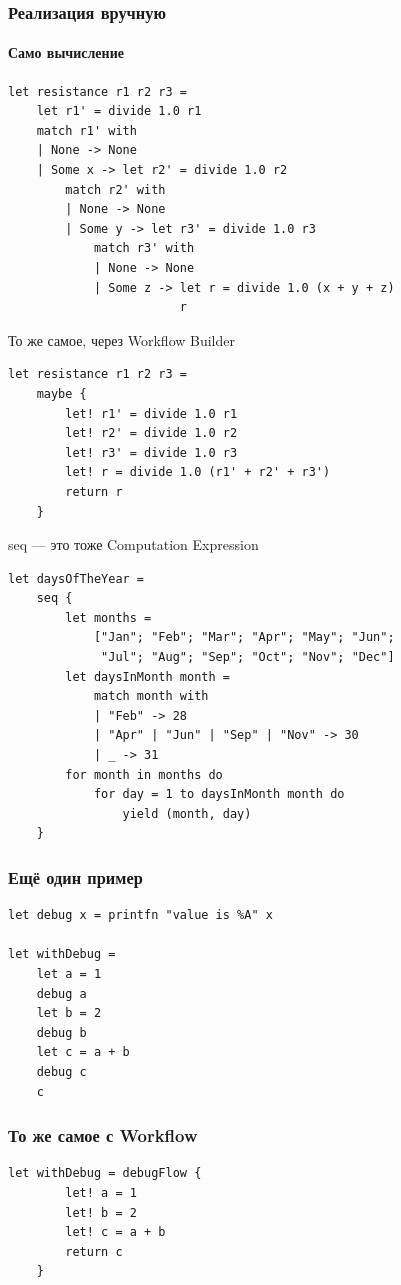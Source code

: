 \documentclass{../../slides-style}
\begin{document}
    \begin{frame}[fragile]
        \frametitle{Реализация вручную}
        \framesubtitle{Само вычисление}
        \begin{verbatim}
let resistance r1 r2 r3 =
    let r1' = divide 1.0 r1
    match r1' with
    | None -> None
    | Some x -> let r2' = divide 1.0 r2
        match r2' with
        | None -> None
        | Some y -> let r3' = divide 1.0 r3
            match r3' with
            | None -> None
            | Some z -> let r = divide 1.0 (x + y + z)
                        r
        \end{verbatim}
    \end{frame}

    \begin{frame}[fragile]{То же самое, через Workflow Builder}
        \begin{verbatim}
let resistance r1 r2 r3 = 
    maybe {
        let! r1' = divide 1.0 r1
        let! r2' = divide 1.0 r2
        let! r3' = divide 1.0 r3
        let! r = divide 1.0 (r1' + r2' + r3')
        return r
    }
        \end{verbatim}
    \end{frame}

    \begin{frame}[fragile]{seq --- это тоже Computation Expression}
        \begin{verbatim}
let daysOfTheYear =
    seq {
        let months =
            ["Jan"; "Feb"; "Mar"; "Apr"; "May"; "Jun";
             "Jul"; "Aug"; "Sep"; "Oct"; "Nov"; "Dec"]
        let daysInMonth month =
            match month with
            | "Feb" -> 28
            | "Apr" | "Jun" | "Sep" | "Nov" -> 30
            | _ -> 31
        for month in months do
            for day = 1 to daysInMonth month do
                yield (month, day)
    }
        \end{verbatim}
    \end{frame}

    \begin{frame}[fragile]
        \frametitle{Ещё один пример}
        \begin{verbatim}
let debug x = printfn "value is %A" x

let withDebug = 
    let a = 1
    debug a
    let b = 2
    debug b
    let c = a + b
    debug c
    c
        \end{verbatim}
    \end{frame}

    \begin{frame}[fragile]
        \frametitle{То же самое с Workflow}
        \begin{verbatim}
let withDebug = debugFlow {
        let! a = 1
        let! b = 2
        let! c = a + b
        return c
    }
        \end{verbatim}
    \end{frame}
\end{document}
